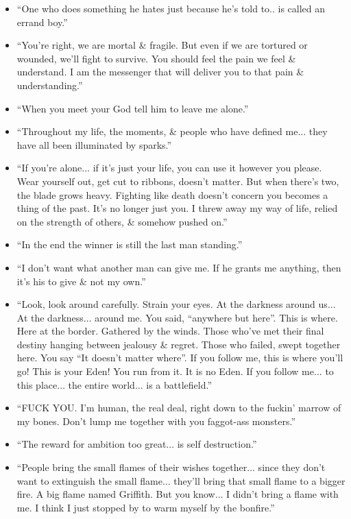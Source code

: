 \documentclass{article}
\begin{document}
\begin{enumerate}
\begin{itemize}
    	\item ``One who does something he hates just because he's told to.. is called an errand boy.''
    	\item ``You're right, we are mortal \& fragile. But even if we are tortured or wounded, we'll fight to survive. You should feel the pain we feel \& understand. I am the messenger that will deliver you to that pain \& understanding.''
    	\item ``When you meet your God tell him to leave me alone.''
    	\item ``Throughout my life, the moments, \& people who have defined me$\ldots$ they have all been illuminated by sparks.''
    	\item ``If you're alone$\ldots$ if it's just your life, you can use it however you please. Wear yourself out, get cut to ribbons, doesn't matter. But when there's two, the blade grows heavy. Fighting like death doesn't concern you becomes a thing of the past. It's no longer just you. I threw away my way of life, relied on the strength of others, \& somehow pushed on.''
    	\item ``In the end the winner is still the last man standing.''
    	\item ``I don't want what another man can give me. If he grants me anything, then it's his to give \& not my own.''
    	\item ``Look, look around carefully. Strain your eyes. At the darkness around us$\ldots$ At the darkness$\ldots$ around me. You said, ``anywhere but here''. This is where. Here at the border. Gathered by the winds. Those who've met their final destiny hanging between jealousy \& regret. Those who failed, swept together here. You say ``It doesn't matter where''. If you follow me, this is where you'll go! This is your Eden! You run from it. It is no Eden. If you follow me$\ldots$ to this place$\ldots$ the entire world$\ldots$ is a battlefield.''
    	\item ``FUCK YOU. I'm human, the real deal, right down to the fuckin' marrow of my bones. Don't lump me together with you faggot-ass monsters.''
    	\item ``The reward for ambition too great$\ldots$ is self destruction.''
    	\item ``People bring the small flames of their wishes together$\ldots$  since they don't want to extinguish the small flame$\ldots$  they'll bring that small flame to a bigger fire. A big flame named Griffith. But you know$\ldots$  I didn't bring a flame with me. I think I just stopped by to warm myself by the bonfire.''

\end{itemize}
\end{enumerate}
\end{document}
